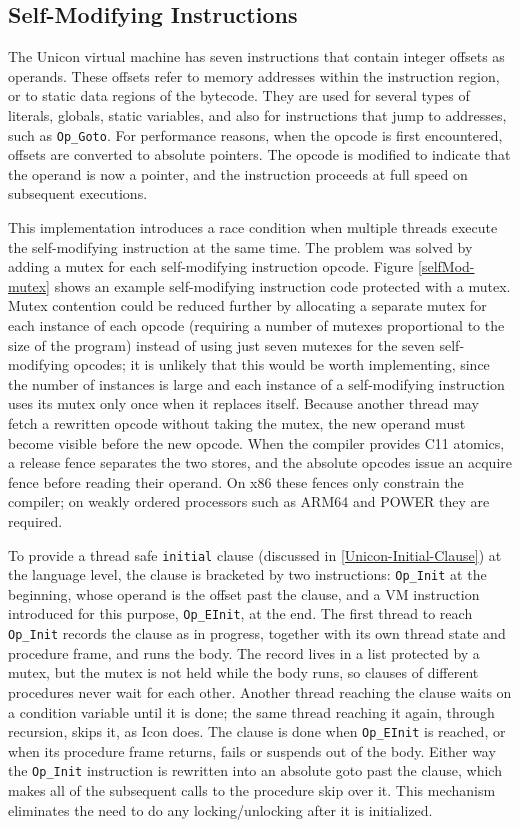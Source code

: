 \subsection{Self-Modifying Instructions}
The Unicon virtual machine has seven instructions that contain integer
offsets as operands.  These offsets refer to memory addresses within the
instruction region, or to static data regions of the bytecode. They are
used for several types of literals, globals, static variables, and also for
instructions that jump to addresses, such as \texttt{Op\_Goto}. For
performance reasons, when the opcode is first encountered, offsets are
converted to absolute pointers.  The opcode is modified to indicate that
the operand is now a pointer, and the instruction proceeds at full speed on
subsequent executions.

This implementation introduces a race condition when multiple threads
execute the self-modifying instruction at the same time. The problem was
solved by adding a mutex for each self-modifying instruction
opcode. Figure \ref{selfMod-mutex} shows an example self-modifying
instruction code protected with a mutex. Mutex contention could be reduced
further by allocating a separate mutex for each instance of each opcode
(requiring a number of mutexes proportional to the size of the program)
instead of using just seven mutexes for the seven self-modifying opcodes;
it is unlikely that this would be worth implementing, since the number of
instances is large and each instance of a self-modifying instruction uses
its mutex only once when it replaces itself.  Because another thread may fetch a rewritten opcode without taking the
mutex, the new operand must become visible before the new opcode. When the
compiler provides C11 atomics, a release fence separates the two stores, and
the absolute opcodes issue an acquire fence before reading their operand. On
x86 these fences only constrain the compiler; on weakly ordered processors
such as ARM64 and POWER they are required.

To provide a thread safe
\texttt{initial} clause (discussed in \ref{Unicon-Initial-Clause}) at the language
level, the clause is bracketed by two instructions: \texttt{Op\_Init} at the
beginning, whose operand is the offset past the clause, and a VM instruction
introduced for this purpose, \texttt{Op\_EInit}, at the end. The first thread
to reach \texttt{Op\_Init} records the clause as in progress, together with
its own thread state and procedure frame, and runs the body. The record lives
in a list protected by a mutex, but the mutex is not held while the body
runs, so clauses of different procedures never wait for each other. Another
thread reaching the clause waits on a condition variable until it is done; the
same thread reaching it again, through recursion, skips it, as Icon does. The
clause is done when \texttt{Op\_EInit} is reached, or when its procedure frame
returns, fails or suspends out of the body. Either way the \texttt{Op\_Init}
instruction is rewritten into an absolute goto past the clause, which makes all
of the subsequent calls to the procedure skip over it.  This mechanism
eliminates the need to do any locking/unlocking after it is initialized.

